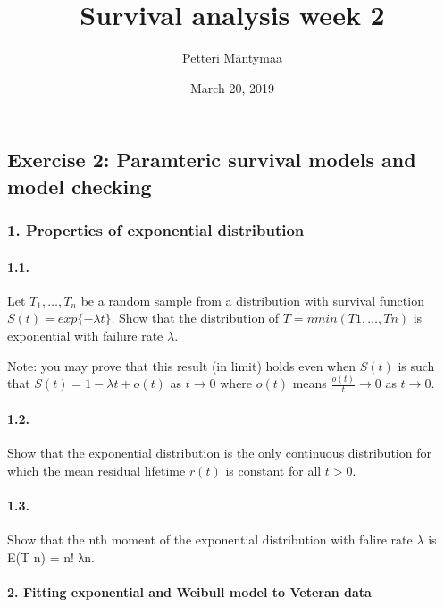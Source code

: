 \documentclass[]{article}
\title{Survival analysis week 2}
\author{Petteri Mäntymaa}
\date{March 20, 2019}
\let\oldparagraph\paragraph
\renewcommand{\paragraph}[1]{\oldparagraph{#1}\mbox{}}
\begin{document}
\maketitle

\subsection{Exercise 2: Paramteric survival models and model
checking}\label{exercise-2-paramteric-survival-models-and-model-checking}

\subsubsection{1. Properties of exponential
distribution}\label{properties-of-exponential-distribution}

\paragraph{1.1.}\label{section}

Let \(T_{1},\dots, T_{n}\) be a random sample from a distribution with
survival function \(S(t) = exp\{−\lambda t\}\). Show that the
distribution of \(T = nmin(T1,\dots, Tn)\) is exponential with failure
rate \(\lambda\).

Note: you may prove that this result (in limit) holds even when \(S(t)\)
is such that \(S(t) = 1 − \lambda t + o(t)\) as \(t \rightarrow 0\)
where \(o(t)\) means \(\frac{o(t)}{t} \rightarrow 0\) as
\(t \rightarrow 0\).

\paragraph{1.2.}\label{section-1}

Show that the exponential distribution is the only continuous
distribution for which the mean residual lifetime \(r(t)\) is constant
for all \(t > 0\).

\paragraph{1.3.}\label{section-2}

Show that the nth moment of the exponential distribution with falire
rate \(\lambda\) is E(T n) = n! λn.

\paragraph{2. Fitting exponential and Weibull model to Veteran
data}\label{fitting-exponential-and-weibull-model-to-veteran-data}
\end{document}
